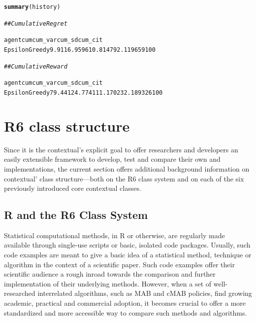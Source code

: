 \documentclass[nojss]{jss}\usepackage[]{graphicx}\usepackage[]{color}
\makeatletter
\newcommand{\hlcom}[1]{\textcolor[rgb]{0.678,0.584,0.686}{\textit{#1}}}%
\newcommand{\hlkwd}[1]{\textcolor[rgb]{0.737,0.353,0.396}{\textbf{#1}}}%
\newenvironment{kframe}{%
 \def\at@end@of@kframe{}%
 \ifinner\ifhmode%
  \def\at@end@of@kframe{\end{minipage}}%
  \begin{minipage}{\columnwidth}%
 \fi\fi%
 \def\FrameCommand##1{\hskip\@totalleftmargin \hskip-\fboxsep
 \colorbox{shadecolor}{##1}\hskip-\fboxsep
     \hskip-\linewidth \hskip-\@totalleftmargin \hskip\columnwidth}%
 \MakeFramed {\advance\hsize-\width
   \@totalleftmargin\z@ \linewidth\hsize
   \@setminipage}}%
 {\par\unskip\endMakeFramed%
 \at@end@of@kframe}
\newenvironment{knitrout}{}{} %
\makeatother
\begin{document}
\begin{knitrout}\small
{}\color{fgcolor}\begin{kframe}
\begin{alltt}
\hlkwd{summary}(history)

\hlcom{## Cumulative Regret}

        agent   cum  cum_var   cum_sd   cum_ci   t
EpsilonGreedy   9.9 116.9596 10.81479 2.119659 100

\hlcom{## Cumulative Reward}

        agent   cum  cum_var   cum_sd   cum_ci   t
EpsilonGreedy 79.44 124.7741 11.17023 2.189326 100
\end{alltt}
\end{kframe}
\end{knitrout}



\section{R6 class structure}

Since it is the contextual's explicit goal to offer researchers and developers an easily extensible framework to develop, test and compare their own  and  implementations, the current section offers additional background information on contextual' class structure---both on the R6 class system and on each of the six previously introduced core contextual classes.

\subsection{R and the R6 Class System}

Statistical computational methods, in R or otherwise, are regularly made available through single-use scripts or basic, isolated code packages. Usually, such code examples are meant to give a basic idea of a statistical method, technique or algorithm in the context of a scientific paper.  Such code examples offer their scientific audience a rough inroad towards the comparison and further implementation of their underlying methods. However, when a set of well-researched interrelated algorithms, such as MAB and cMAB policies, find growing academic, practical and commercial adoption, it becomes crucial to offer a more standardized and more accessible way to compare such methods and algorithms.
\end{document}
